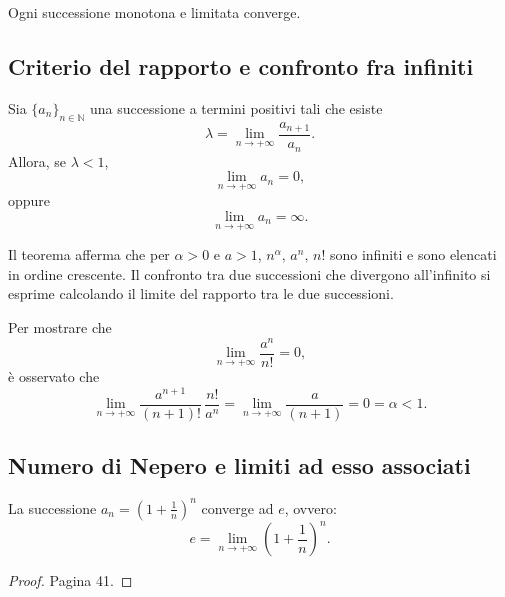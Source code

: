 \begin{corollary}
    Ogni successione monotona e limitata converge.
\end{corollary}

\subsection{Criterio del rapporto e confronto fra infiniti}
\begin{theorem}
    Sia $\{a_n\}_{n\in\mathbb N}$ una successione a termini positivi tali che esiste
    \begin{equation*}
        \lambda=\lim_{n\rightarrow+\infty}\frac{a_{n+1}}{a_n}.
    \end{equation*}
    Allora, se $\lambda<1$,
    \begin{equation*}
        \lim_{n\rightarrow+\infty}a_n=0,
    \end{equation*}
    oppure
    \begin{equation*}
        \lim_{n\rightarrow+\infty}a_n=\infty.
    \end{equation*}
\end{theorem}

Il teorema afferma che per $\alpha>0$ e $a>1$, $n^\alpha,\, a^n,\, n!$ sono infiniti e sono elencati in ordine crescente. Il confronto tra due successioni che divergono all'infinito si esprime calcolando il limite del rapporto tra le due successioni.

\begin{example}
    Per mostrare che
    \begin{equation*}
        \lim_{n\rightarrow+\infty}\frac{a^n}{n!}=0,
    \end{equation*}
    è osservato che
    \begin{equation*}
        \lim_{n\rightarrow+\infty}\frac{a^{n+1}}{(n+1)!}\,\frac{n!}{a^n}=\lim_{n\rightarrow+\infty}\frac{a}{(n+1)}=0=\alpha<1.
    \end{equation*}
\end{example}

\subsection{Numero di Nepero e limiti ad esso associati}
\begin{theorem}
    La successione $a_n=\left(1+\frac{1}{n}\right)^n$ converge ad $e$, ovvero:
    \begin{equation*}
        e = \lim_{n\rightarrow+\infty}\left(1+\frac{1}{n}\right)^n.
    \end{equation*}
\end{theorem}
\begin{proof}
    Pagina 41.
\end{proof}

